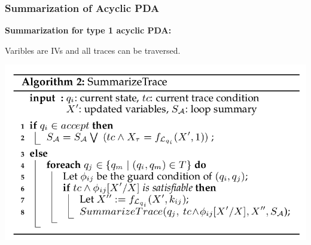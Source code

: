 \documentclass[11pt]{beamer}
\begin{document}
\begin{frame}\frametitle{Summarization of Acyclic PDA}
\textbf{Summarization for type 1 acyclic PDA:}

Varibles are IVs and all traces can be traversed.

\begin{center}
\begin{center}

\includegraphics[scale=0.36]{algo2.png}
\end{center}
\end{center}
\end{frame}
\end{document}
